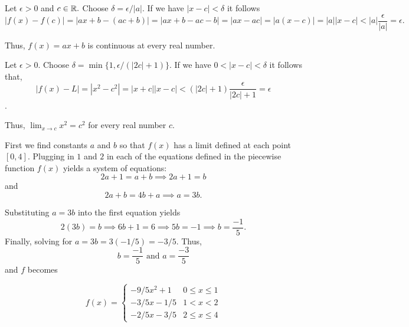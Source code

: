 \documentclass{report}
\begin{document}
\pagebreak
{}


\begin{myproof}
    Let $\epsilon >0$ and $c \in \RR.$ Choose $\delta = \epsilon/|a|.$ If we have $ |x-c|< \delta$ it follows $$ |f(x) - f(c)| = |ax +b - (ac+b)| = | ax + b -ac - b | = |ax -ac| = |a(x-c)| = |a||x-c|< |a|\frac{\epsilon}{|a|} = \epsilon.$$

Thus, $f(x)=a x+b$ is continuous at every real number.
\end{myproof}


\begin{myproof}
  Let $\epsilon > 0.$ Choose $\delta = \min\{1, \epsilon/(|2c|+1)\}$. If we have $0 < |x-c| < \delta$ it follows that, $$|f(x) - L| = |x^2 - c^2| = |x + c||x-c| < (|2c|+1)\frac{\epsilon}{|2c|+1} = \epsilon$$.

Thus, $\lim _{x \rightarrow c} x^2=c^2$ for every real number $c$.
\end{myproof}


\pagebreak
{}
\bigskip
\sol

First we find constants $a$ and $b$ so that $f(x)$ has a limit defined at each point $[0,4].$ Plugging in $1$ and $2$ in each of the equations defined in the piecewise function $f(x)$ yields a system of equations:$$ 2a +1 = a + b \implies 2a +1 = b$$
and $$2a +b = 4b + a \implies a = 3b.$$

Substituting $a = 3b$ into the first equation yields $$2(3b) = b \implies 6b + 1 =6 \implies 5b = -1 \implies b = \frac{-1}{5}.$$ Finally, solving for $a = 3b = 3 (-1/5) = -3/5.$ Thus, $$ b = \frac{-1}{5} \text { and } a = \frac{-3}{5} $$ and $f$ becomes


$$
f(x)=\left\{\begin{array}{cc}
-9/5 x^2+1 & 0 \leq x \leq 1 \\
-3/5 x - 1/5 & 1<x<2 \\
-2/5 x - 3/5 & 2 \leq x \leq 4
\end{array}\right.
$$
\pagebreak
\end{document}

